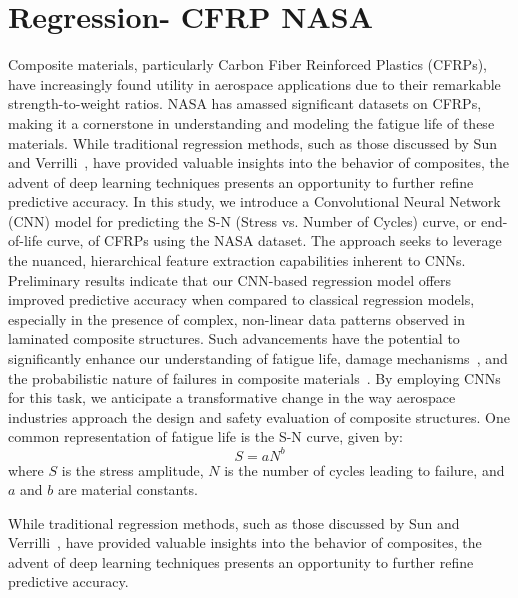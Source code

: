 \section{Regression- CFRP NASA}
\label{Regression- CFRP NASA}
Composite materials, particularly Carbon Fiber Reinforced Plastics (CFRPs), have increasingly found utility in aerospace applications due to their remarkable strength-to-weight ratios. NASA has amassed significant datasets on CFRPs, making it a cornerstone in understanding and modeling the fatigue life of these materials. While traditional regression methods, such as those discussed by Sun and Verrilli~\cite{sun2002fatigue}, have provided valuable insights into the behavior of composites, the advent of deep learning techniques presents an opportunity to further refine predictive accuracy. In this study, we introduce a Convolutional Neural Network (CNN) model for predicting the S-N (Stress vs. Number of Cycles) curve, or end-of-life curve, of CFRPs using the NASA dataset. The approach seeks to leverage the nuanced, hierarchical feature extraction capabilities inherent to CNNs. Preliminary results indicate that our CNN-based regression model offers improved predictive accuracy when compared to classical regression models, especially in the presence of complex, non-linear data patterns observed in laminated composite structures. Such advancements have the potential to significantly enhance our understanding of fatigue life, damage mechanisms~\cite{talreja2012damage}, and the probabilistic nature of failures in composite materials~\cite{glaessgen2009probabilistic}. By employing CNNs for this task, we anticipate a transformative change in the way aerospace industries approach the design and safety evaluation of composite structures. One common representation of fatigue life is the S-N curve, given by:
\begin{equation}
    S = aN^b
\end{equation}
where \(S\) is the stress amplitude, \(N\) is the number of cycles leading to failure, and \(a\) and \(b\) are material constants. 

While traditional regression methods, such as those discussed by Sun and Verrilli~\cite{sun2002fatigue}, have provided valuable insights into the behavior of composites, the advent of deep learning techniques presents an opportunity to further refine predictive accuracy. 

